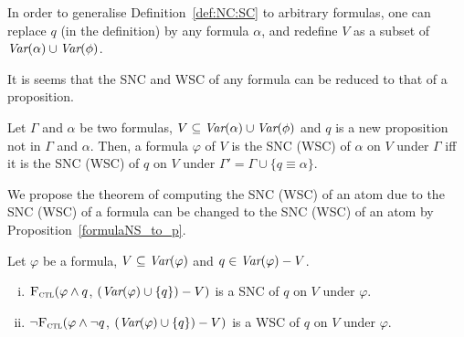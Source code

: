 \documentclass{article}
\begin{document}
In order to generalise Definition~\ref{def:NC:SC} to arbitrary formulas, one can replace $q$ (in the definition)  by any formula $\alpha$, and redefine  $V$ as a subset of $\textit{Var}(\alpha) \cup \textit{Var}(\phi)$.



  It is seems that the SNC and WSC of any formula can be reduced to that of a proposition.
\begin{proposition}\label{formulaNS_to_p}
     Let $\Gamma$ and $\alpha$ be two formulas, $V \subseteq \textit{Var}(\alpha) \cup \textit{Var}(\phi)$  and $q$ is a new proposition not in $\Gamma$ and $\alpha$.
 Then, a formula $\varphi$ of $V$ is the SNC (WSC) of $\alpha$ on $V$ under  $\Gamma$ iff it is the SNC (WSC) of $q$ on $V$ under $\Gamma' = \Gamma \cup \{q \equiv \alpha\}$.   \end{proposition}

We propose the theorem of computing the SNC (WSC) of an atom due to the SNC (WSC) of a formula can be changed to the SNC (WSC) of an atom by Proposition~\ref{formulaNS_to_p}.
\begin{theorem}\label{thm:SNC:WSC:forget}
 Let $\varphi$ be a formula, $V\subseteq\textit{Var}(\varphi)$ and $q\in\textit{Var}(\varphi)- V$.
 \begin{enumerate}[(i)]
   \item ${\textsc{F}_{\textsc{ctl}}} (\varphi \land q$, $(\textit{Var}(\varphi) \cup \{q\})- V)$
   is a SNC of $q$ on $V$ under $\varphi$.
   \item  $\neg{\textsc{F}_{\textsc{ctl}}} (\varphi \land \neg q$, $(\textit{Var}(\varphi) \cup \{q\})- V)$
   is a WSC of $q$ on $V$ under $\varphi$.
 \end{enumerate}
 \end{theorem}
\end{document}
